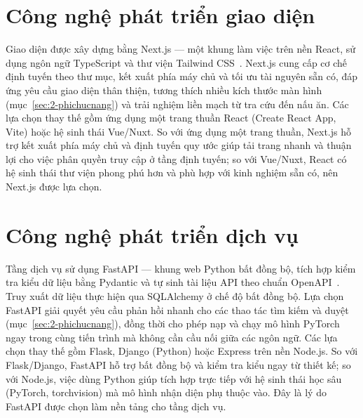 \documentclass[../DoAn.tex]{subfiles}
\begin{document}

\section{Công nghệ phát triển giao diện}
\label{sec:3-frontend}
Giao diện được xây dựng bằng Next.js --- một khung làm việc trên nền React, sử dụng ngôn ngữ TypeScript và thư viện Tailwind CSS~\cite{nextjs}. Next.js cung cấp cơ chế định tuyến theo thư mục, kết xuất phía máy chủ và tối ưu tài nguyên sẵn có, đáp ứng yêu cầu giao diện thân thiện, tương thích nhiều kích thước màn hình (mục~\ref{sec:2-phichucnang}) và trải nghiệm liền mạch từ tra cứu đến nấu ăn. Các lựa chọn thay thế gồm ứng dụng một trang thuần React (Create React App, Vite) hoặc hệ sinh thái Vue/Nuxt. So với ứng dụng một trang thuần, Next.js hỗ trợ kết xuất phía máy chủ và định tuyến quy ước giúp tải trang nhanh và thuận lợi cho việc phân quyền truy cập ở tầng định tuyến; so với Vue/Nuxt, React có hệ sinh thái thư viện phong phú hơn và phù hợp với kinh nghiệm sẵn có, nên Next.js được lựa chọn.

\section{Công nghệ phát triển dịch vụ}
\label{sec:3-backend}
Tầng dịch vụ sử dụng FastAPI --- khung web Python bất đồng bộ, tích hợp kiểm tra kiểu dữ liệu bằng Pydantic và tự sinh tài liệu API theo chuẩn OpenAPI~\cite{fastapi}. Truy xuất dữ liệu thực hiện qua SQLAlchemy ở chế độ bất đồng bộ. Lựa chọn FastAPI giải quyết yêu cầu phản hồi nhanh cho các thao tác tìm kiếm và duyệt (mục~\ref{sec:2-phichucnang}), đồng thời cho phép nạp và chạy mô hình PyTorch~\cite{pytorch} ngay trong cùng tiến trình mà không cần cầu nối giữa các ngôn ngữ. Các lựa chọn thay thế gồm Flask, Django (Python) hoặc Express trên nền Node.js. So với Flask/Django, FastAPI hỗ trợ bất đồng bộ và kiểm tra kiểu ngay từ thiết kế; so với Node.js, việc dùng Python giúp tích hợp trực tiếp với hệ sinh thái học sâu (PyTorch, torchvision) mà mô hình nhận diện phụ thuộc vào. Đây là lý do FastAPI được chọn làm nền tảng cho tầng dịch vụ.
\end{document}
